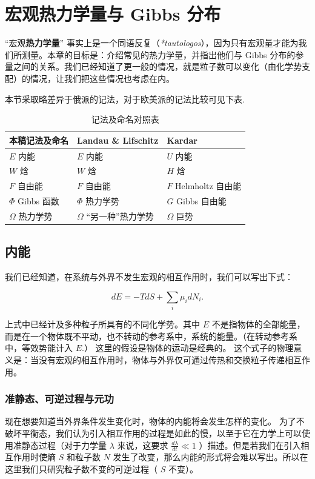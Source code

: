 \chapter{宏观热力学量与 Gibbs 分布}
“宏观\textbf{热力学量}” 事实上是一个同语反复（\textit{*tautologos}），因为只有宏观量才能为我们所测量。本章的目标是：介绍常见的热力学量，并指出他们与 Gibbs 分布的参量之间的关系。我们已经知道了更一般的情况，就是粒子数可以变化（由化学势支配）的情况，让我们把这些情况也考虑在内。

{\noindent \kaishu 本节采取略差异于俄派的记法，对于欧美派的记法比较可见下表.}
\begin{table}[htbp!]
    \centering
    \begin{tabular}{lll}
        \hline 
        本稿记法及命名 & Landau \& Lifschitz & Kardar \\
        \hline 
        $E$ 内能 & $E$ 内能 & $U$ 内能 \\  
        $W$ 焓 & $W$ 焓 & $H$ 焓 \\
        $F$ 自由能 & $F$ 自由能 & $F$ Helmholtz 自由能 \\
        $\Phi$ Gibbs 函数 & $\Phi$ 热力学势 & $G$ Gibbs 自由能 \\
        $\Omega$ 热力学势 & $\Omega$ “另一种”热力学势 & $\Omega$ 巨势 \\
        \hline \hline
    \end{tabular}
    \caption{记法及命名对照表}
\end{table}
\section{内能}
我们已经知道，在系统与外界不发生宏观的相互作用时，我们可以写出下式：
\begin{linenomath}\begin{equation}
dE = -TdS + \sum_i\mu_idN_i.
\end{equation}\end{linenomath}
上式中已经计及多种粒子所具有的不同化学势。其中 $E$ 不是指物体的全部能量，而是在一个物体既不平动，也不转动的参考系中，系统的能量。（在转动参考系中，等效势能计入 $E.$） 这里的假设是物体的运动是经典的。
这个式子的物理意义是：当没有宏观的相互作用时，物体与外界仅可通过传热和交换粒子传递相互作用。
\subsection{准静态、可逆过程与元功}
\label{work}
现在想要知道当外界条件发生变化时，物体的内能将会发生怎样的变化。
为了不破坏平衡态，我们认为引入相互作用的过程是如此的慢，以至于它在力学上可以使用准静态过程（对于力学量 $\lambda$ 来说，这要求 $\frac{d\lambda}{dt}\ll 1$ ）描述。但是若我们在引入相互作用时使熵 $S$ 和粒子数 $N$ 发生了改变，那么内能的形式将会难以写出。所以在这里我们只研究粒子数不变的可逆过程（ $S$ 不变）。

